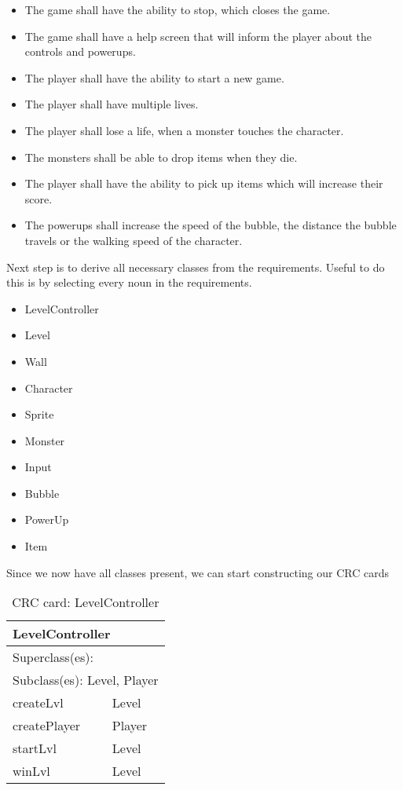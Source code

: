 \begin{itemize}
   \item The game shall have the ability to stop, which closes the game.
   \item The game shall have a help screen that will inform the player about the controls and powerups.
   \item The player shall have the ability to start a new game.
   \item The player shall have multiple lives.
   \item The player shall lose a life, when a monster touches the character. 
   \item The monsters shall be able to drop items when they die.
   \item The player shall have the ability to pick up items which will increase their score.
   \item The powerups shall increase the speed of the bubble, the distance the bubble travels or the walking speed of the character.
\end{itemize}

Next step is to derive all necessary classes from the requirements. Useful to do this is by selecting every noun in the requirements. 
\begin{itemize}
    \item LevelController
    \item Level
    \item Wall
    \item Character
    \item Sprite
    \item Monster
    \item Input
    \item Bubble
    \item PowerUp
    \item Item
\end{itemize}

Since we now have all classes present, we can start constructing our CRC cards

\begin{table}[]
\centering
\label{crc_levelcontroller}
\begin{tabular}{|l|l|}
\hline
\multicolumn{2}{|l|}{LevelController} \\ \hline
\multicolumn{2}{|l|}{Superclass(es):} \\ \hline
\multicolumn{2}{|l|}{Subclass(es): Level, Player} \\ \hline
createLvl               & Level \\ \hline
createPlayer            & Player \\ \hline
startLvl                & Level \\ \hline
winLvl                  & Level \\ \hline
\end{tabular}
\caption{CRC card: LevelController}
\end{table}

